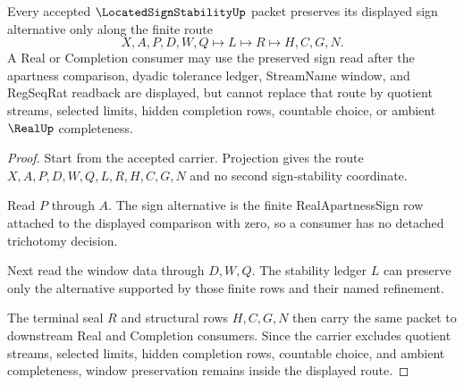 \begin{theorem}
\label{thm:located-sign-stability-window-preservation}
Every accepted $\LocatedSignStabilityUp$ packet preserves its displayed sign alternative only along the finite route
$$
X,A,P,D,W,Q \longmapsto L \longmapsto R \longmapsto H,C,G,N .
$$
A Real or Completion consumer may use the preserved sign read after the apartness comparison, dyadic tolerance ledger, StreamName window, and RegSeqRat readback are displayed, but cannot replace that route by quotient streams, selected limits, hidden completion rows, countable choice, or ambient $\RealUp$ completeness.
\end{theorem}
\begin{proof}
Start from the accepted carrier. Projection gives the route $X,A,P,D,W,Q,L,R,H,C,G,N$ and no second sign-stability coordinate.

Read $P$ through $A$. The sign alternative is the finite RealApartnessSign row attached to the displayed comparison with zero, so a consumer has no detached trichotomy decision.

Next read the window data through $D,W,Q$. The stability ledger $L$ can preserve only the alternative supported by those finite rows and their named refinement.

The terminal seal $R$ and structural rows $H,C,G,N$ then carry the same packet to downstream Real and Completion consumers. Since the carrier excludes quotient streams, selected limits, hidden completion rows, countable choice, and ambient completeness, window preservation remains inside the displayed route.
\end{proof}


\begin{closurestatus}{\LocatedSignStabilityUp}
  \theoryclosure{\seedClosure}
  \formalstatus{\unformalizedV}
\end{closurestatus}
